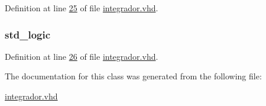 Definition at line \hyperlink{integrador_8vhd_source_l00025}{25} of file \hyperlink{integrador_8vhd_source}{integrador.\+vhd}.

\hypertarget{classintegrador_1_1integrador_a45126d1a75be347f440d181b7aa5e033}{}
\subsubsection[{sinc\+\_\+int}]{ {\bfseries \textcolor{comment}{std\+\_\+logic}\textcolor{vhdlchar}{ }} \hspace{0.3cm}{\ttfamily [Signal]}}\label{classintegrador_1_1integrador_a45126d1a75be347f440d181b7aa5e033}


Definition at line \hyperlink{integrador_8vhd_source_l00026}{26} of file \hyperlink{integrador_8vhd_source}{integrador.\+vhd}.



The documentation for this class was generated from the following file\+:\begin{DoxyCompactItemize}
\item 
\hyperlink{integrador_8vhd}{integrador.\+vhd}\end{DoxyCompactItemize}
